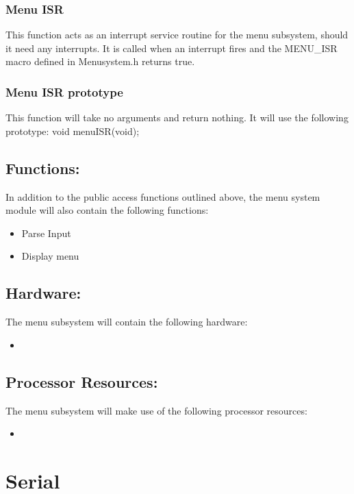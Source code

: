 \documentclass[]{article}
\begin{document}
\subsubsection{Menu ISR}
This function acts as an interrupt service routine for the menu subsystem, should it need any interrupts. It is called when an interrupt fires and the MENU\_ISR macro defined in Menusystem.h returns true.

\subsubsection{Menu ISR prototype}
This function will take no arguments and return nothing. It will use the following prototype: \newline \newline
void menuISR(void);

\subsection{Functions:}
In addition to the public access functions outlined above, the menu system module will also contain the following functions: \newline

\begin{itemize}
	\item Parse Input
	\item Display menu
\end{itemize}

\subsection{Hardware:}
The menu subsystem will contain the following hardware:

\begin{itemize}
	\item 
\end{itemize}

\subsection{Processor Resources:}
The menu subsystem will make use of the following processor resources: 

\begin{itemize}
	\item
\end{itemize}

\newpage
\section{Serial}
\end{document}
